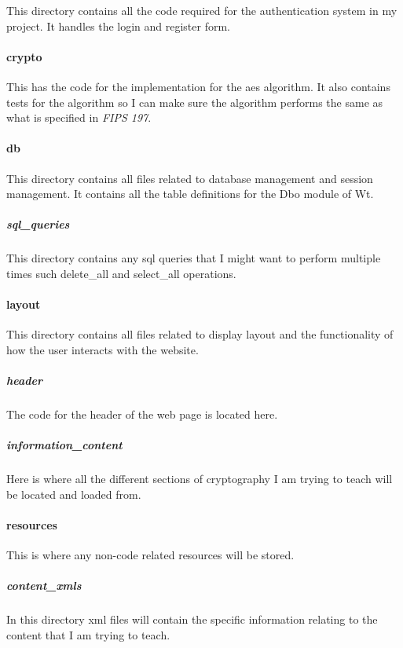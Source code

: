 This directory contains all the code required for the authentication system in my project. It handles the login and register form.

\paragraph{crypto}

This has the code for the implementation for the aes algorithm. It also contains tests for the algorithm so I can make sure the algorithm performs the same as what is specified in \textit{FIPS 197}.

\paragraph{db}

This directory contains all files related to database management and session management. It contains all the table definitions for the Dbo module of Wt.

\subparagraph{sql\_queries}

This directory contains any sql queries that I might want to perform multiple times such delete_all and select_all operations.

\paragraph{layout}

This directory contains all files related to display layout and the functionality of how the user interacts with the website.

\subparagraph{header}

The code for the header of the web page is located here.

\subparagraph{information\_content}

Here is where all the different sections of cryptography I am trying to teach will be located and loaded from. 

\paragraph{resources}

This is where any non-code related resources will be stored.

\subparagraph{content\_xmls}

In this directory xml files will contain the specific information relating to the content that I am trying to teach.

